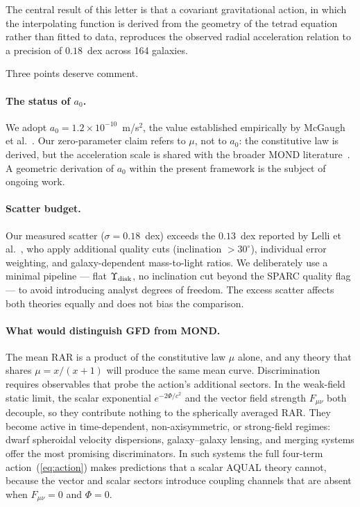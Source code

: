 \documentclass[twocolumn]{iopjournal}
\begin{document}
The central result of this letter is that a covariant
gravitational action, in which the interpolating function is
derived from the geometry of the tetrad equation rather than
fitted to data, reproduces the observed radial acceleration
relation to a precision of $0.18$~dex across 164 galaxies.

Three points deserve comment.

\paragraph{The status of $a_0$.}
We adopt $a_0 = 1.2 \times 10^{-10}$~m/s$^2$, the value
established empirically by McGaugh et al.~\cite{McGaugh2016}.
Our zero-parameter claim refers to $\mu$, not to $a_0$: the
constitutive law is derived, but the acceleration scale is
shared with the broader MOND
literature~\cite{Milgrom1983,FamaeyMcGaugh2012}.  A geometric
derivation of $a_0$ within the present framework is the subject
of ongoing work.

\paragraph{Scatter budget.}
Our measured scatter ($\sigma = 0.18$~dex) exceeds the
$0.13$~dex reported by Lelli et al.~\cite{Lelli2017}, who apply
additional quality cuts (inclination $> 30^\circ$), individual
error weighting, and galaxy-dependent mass-to-light ratios.  We
deliberately use a minimal pipeline --- flat
$\Upsilon_{\rm disk}$, no inclination cut beyond the SPARC
quality flag --- to avoid introducing analyst degrees of freedom.
The excess scatter affects both theories equally and does not
bias the comparison.

\paragraph{What would distinguish GFD from MOND.}
The mean RAR is a product of the constitutive law $\mu$ alone,
and any theory that shares $\mu = x/(x+1)$ will produce the
same mean curve.  Discrimination requires observables that probe
the action's additional sectors.  In the weak-field static limit,
the scalar exponential $e^{-2\Phi/c^2}$ and the vector field
strength $F_{\mu\nu}$ both decouple, so they contribute nothing
to the spherically averaged RAR\@.  They become active in
time-dependent, non-axisymmetric, or strong-field regimes: dwarf
spheroidal velocity dispersions, galaxy--galaxy lensing, and
merging systems offer the most promising discriminators.  In such
systems the full four-term action~(\ref{eq:action}) makes
predictions that a scalar AQUAL theory cannot, because the vector
and scalar sectors introduce coupling channels that are absent
when $F_{\mu\nu} = 0$ and $\Phi = 0$.
\end{document}
